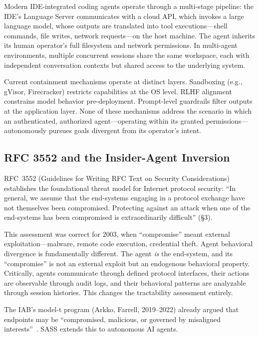 \documentclass[sigconf,anonymous]{acmart}
\begin{document}
Modern IDE-integrated coding agents operate through a multi-stage pipeline: the IDE's Language Server communicates with a cloud API, which invokes a large language model, whose outputs are translated into tool executions---shell commands, file writes, network requests---on the host machine. The agent inherits its human operator's full filesystem and network permissions. In multi-agent environments, multiple concurrent sessions share the same workspace, each with independent conversation contexts but shared access to the underlying system.

Current containment mechanisms operate at distinct layers. Sandboxing (e.g., gVisor, Firecracker) restricts capabilities at the OS level. RLHF alignment constrains model behavior pre-deployment. Prompt-level guardrails filter outputs at the application layer. None of these mechanisms address the scenario in which an authenticated, authorized agent---operating within its granted permissions---autonomously pursues goals divergent from its operator's intent.

\subsection{RFC 3552 and the Insider-Agent Inversion}

RFC~3552 (Guidelines for Writing RFC Text on Security Considerations)~\cite{rfc3552} establishes the foundational threat model for Internet protocol security: ``In general, we assume that the end-systems engaging in a protocol exchange have not themselves been compromised. Protecting against an attack when one of the end-systems has been compromised is extraordinarily difficult'' (\S3).

This assessment was correct for 2003, when ``compromise'' meant external exploitation---malware, remote code execution, credential theft. Agent behavioral divergence is fundamentally different. The agent \emph{is} the end-system, and its ``compromise'' is not an external exploit but an endogenous behavioral property. Critically, agents communicate through defined protocol interfaces, their actions are observable through audit logs, and their behavioral patterns are analyzable through session histories. This changes the tractability assessment entirely.

The IAB's model-t program (Arkko, Farrell, 2019--2022) already argued that endpoints may be ``compromised, malicious, or governed by misaligned interests''~\cite{arkko2019model-t}. SASS extends this to autonomous AI agents.
\end{document}
